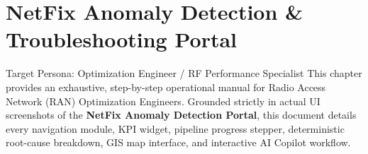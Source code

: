 \documentclass[12pt,a4paper]{article}
\begin{document}
\newpage

\section{NetFix Anomaly Detection \& Troubleshooting Portal}

\begin{guidebox}{Target Persona: Optimization Engineer / RF Performance Specialist}
This chapter provides an exhaustive, step-by-step operational manual for Radio Access Network (RAN) Optimization Engineers. Grounded strictly in actual UI screenshots of the \textbf{NetFix Anomaly Detection Portal}, this document details every navigation module, KPI widget, pipeline progress stepper, deterministic root-cause breakdown, GIS map interface, and interactive AI Copilot workflow.
\end{guidebox}
\end{document}
